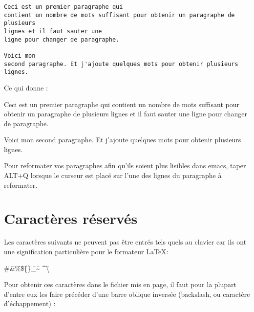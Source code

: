 \begin{footnotesize}
\begin{verbatim}
Ceci est un premier paragraphe qui
contient un nombre de mots suffisant pour obtenir un paragraphe de plusieurs
lignes et il faut sauter une
ligne pour changer de paragraphe.

Voici mon 
second paragraphe. Et j'ajoute quelques mots pour obtenir plusieurs
lignes.
\end{verbatim}
\end{footnotesize}

Ce qui donne :

\begin{boxedminipage}{.5\textwidth}
Ceci est un premier paragraphe qui
contient un nombre de mots suffisant pour obtenir un paragraphe de plusieurs
lignes et il faut sauter une
ligne pour changer de paragraphe.

Voici mon 
second paragraphe. Et j'ajoute quelques mots pour obtenir plusieurs
lignes.
\end{boxedminipage}

Pour reformater vos paragraphes afin qu'ils soient plus lisibles dans
emacs, taper ALT+Q lorsque le curseur est placé sur l'une des lignes
du paragraphe à reformater.


\section{Caractères réservés}

Les caractères suivants ne peuvent pas être entrés tels quels au
clavier car ils ont une signification particulière pour le formateur
\LaTeX :

\begin{flushleft}
\begin{tabbing}
\#\hspace{1cm}\=
\&\hspace{1cm}\=
\%\hspace{1cm}\=
\$\hspace{1cm}\=
\{\hspace{1cm}\=
\}\hspace{1cm}\=
\_\hspace{1cm}\=
\~{} \hspace{1cm}\=
\^{}\hspace{1cm}\=
\textbackslash
\end{tabbing}
\end{flushleft}

Pour obtenir ces caractères dans le fichier mis en page, il faut pour la plupart
d'entre eux les faire précéder d'une barre oblique inversée (backslash, ou
caractère d'échappement) :

